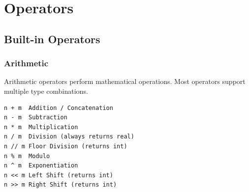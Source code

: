 \documentclass{report}
\begin{document}
\chapter{Operators}
\label{sec:operators}

\section{Built-in Operators}

\subsection{Arithmetic}
Arithmetic operators perform mathematical operations. Most operators support multiple type combinations.
\begin{verbatim}
n + m  Addition / Concatenation
n - m  Subtraction
n * m  Multiplication
n / m  Division (always returns real)
n // m Floor Division (returns int)
n % m  Modulo
n ^ m  Exponentiation
n << m Left Shift (returns int)
n >> m Right Shift (returns int)
\end{verbatim}
\end{document}
